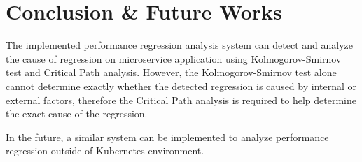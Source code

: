 \documentclass[conference]{configs/IEEEtran}
\begin{document}
\section{Conclusion \& Future Works}
The implemented performance regression analysis system can detect and analyze the cause of regression on microservice application using Kolmogorov-Smirnov test and Critical Path analysis. However, the Kolmogorov-Smirnov test alone cannot determine exactly whether the detected regression is caused by internal or external factors, therefore the Critical Path analysis is required to help determine the exact cause of the regression.

In the future, a similar system can be implemented to analyze performance regression outside of Kubernetes environment.

%




\vspace{12pt}
\end{document}
